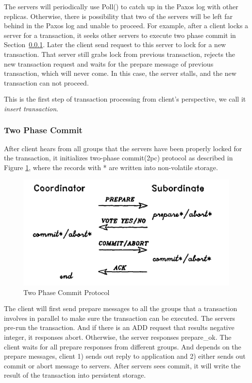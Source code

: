 \documentclass{vldb}
\begin{document}
The servers will periodically use Poll() to catch up in the Paxos log with other
replicas. Otherwise, there is possibility that two of the servers will be left far
behind in the Paxos log and unable to proceed. For example, after a client locks a
server for a transaction, it seeks other servers to execute two phase commit in
Section~\ref{sec:2pc}. Later the client send request to this server to lock for a new
transaction. That server still grabs lock from previous transaction, rejects the new
transaction request and waits for the prepare message of previous transaction, which
will never come. In this case, the server stalls, and the new transaction can not
proceed.

This is the first step of transaction processing from client's perspective, we call
it \textit{insert transaction}.


\subsubsection{Two Phase Commit}
\label{sec:2pc}

After client hears from all groups that the servers have been properly locked for the
transaction, it initializes two-phase commit(2pc) protocol as described in Figure
\ref{fig:2pc}, where the records with * are written into non-volatile storage.

\begin{figure}[h!]
  \centering
  \includegraphics[width = 0.8\linewidth]{figs/2PC.pdf}
  \caption{Two Phase Commit Protocol}
  \label{fig:2pc}
\end{figure}

The client will first send prepare messages to all the groups that a transaction
involves in parallel to make sure the transaction can be executed. The servers
pre-run the transaction. And if there is an ADD request that results negative
integer, it responses abort. Otherwise, the server responses prepare\_ok. The
client waits for all prepare responses from different groups. And depends on the
prepare messages, client 1) sends out reply to application and 2) either sends out
commit or abort message to servers. After servers sees commit, it will write the
result of the transaction into persistent storage.
\end{document}
